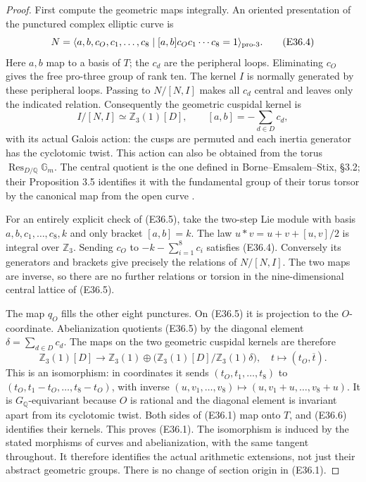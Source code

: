 \begin{proof}
First compute the geometric maps integrally. An oriented
presentation of the punctured complex elliptic curve is
\[
 N=\langle a,b,c_O,c_1,\ldots,c_8\mid
              [a,b]c_Oc_1\cdots c_8=1\rangle_{\rm pro\text{-}3}.
 \tag{E36.4}
\]
Here $a,b$ map to a basis of $T$; the $c_d$ are the
peripheral loops. Eliminating $c_O$ gives the free pro-three
group of rank ten. The kernel $I$ is normally generated by
these peripheral loops. Passing to $N/[N,I]$ makes all
$c_d$ central and leaves only the indicated relation.
Consequently the geometric cuspidal kernel is
\[
 I/[N,I]\simeq\mathbb Z_3(1)[D],
 \qquad [a,b]=-\sum_{d\in D}c_d,
 \tag{E36.5}
\]
with its actual Galois action: the cusps are permuted and
each inertia generator has the cyclotomic twist. This action
can also be obtained from the torus
$\operatorname{Res}_{D/\mathbb Q}\mathbb G_m$.
The central quotient is the one defined in
Borne--Emsalem--Stix, \S3.2; their Proposition 3.5 identifies
it with the fundamental group of their torus torsor by
the canonical map from the open curve
\cite{E_BorneEmsalemStix}.

For an entirely explicit check of (E36.5), take the
two-step Lie module with basis
$a,b,c_1,\ldots,c_8,k$ and only bracket $[a,b]=k$.
The law $u*v=u+v+[u,v]/2$ is integral over $\mathbb Z_3$.
Sending $c_O$ to $-k-\sum_{i=1}^8c_i$ satisfies (E36.4).
Conversely its generators and brackets give precisely the
relations of $N/[N,I]$. The two maps are inverse, so there
are no further relations or torsion in the nine-dimensional
central lattice of (E36.5).

The map $q_O$ fills the other eight punctures. On (E36.5)
it is projection to the $O$-coordinate. Abelianization
quotients (E36.5) by the diagonal element
$\delta=\sum_{d\in D}c_d$. The maps on the two geometric
cuspidal kernels are therefore
\[
 \mathbb Z_3(1)[D]\longrightarrow
 \mathbb Z_3(1)\oplus
       \bigl(\mathbb Z_3(1)[D]/\mathbb Z_3(1)\delta\bigr),
 \quad t\longmapsto(t_O,\overline t).
 \tag{E36.6}
\]
This is an isomorphism: in coordinates it sends
$(t_O,t_1,\ldots,t_8)$ to
$(t_O,t_1-t_O,\ldots,t_8-t_O)$, with inverse
$(u,v_1,\ldots,v_8)\mapsto(u,v_1+u,\ldots,v_8+u)$.
It is $G_{\mathbb Q}$-equivariant because $O$ is rational
and the diagonal element is invariant apart from its
cyclotomic twist. Both sides of (E36.1) map onto $T$,
and (E36.6) identifies their kernels. This proves (E36.1).
The isomorphism is induced by the stated morphisms of
curves and abelianization, with the same tangent throughout.
It therefore identifies the actual arithmetic extensions,
not just their abstract geometric groups. There is no
change of section origin in (E36.1).


\end{proof}
